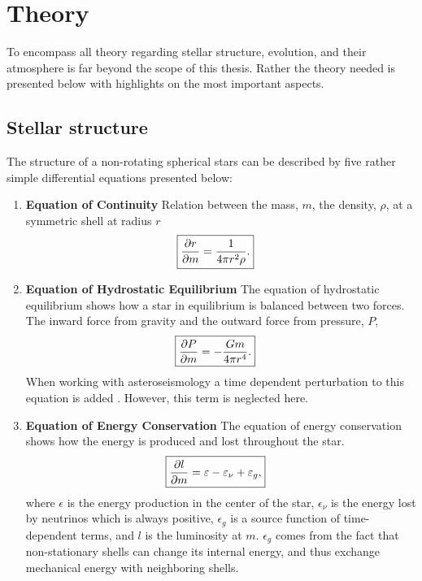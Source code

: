 \chapter{Theory}

To encompass all theory regarding stellar structure, evolution, and their
atmosphere is far beyond the scope of this thesis. Rather the theory needed is
presented below with highlights on the most important aspects.

\section{Stellar structure}

The structure of a non-rotating spherical stars can be described by five rather
simple differential equations \citep[see e.g.][]{kippenhahn} presented below:
\begin{enumerate}
    \item \textbf{Equation of Continuity}
        \nicebreak
        Relation between the mass, $m$, the density, $\rho$, at a symmetric
        shell at radius $r$
        \begin{align}
            \Aboxed{\pd{r}{m} &= \frac{1}{4\pi r^2\rho}.}
        \end{align}

    \item \textbf{Equation of Hydrostatic Equilibrium}
        \nicebreak
        The equation of hydrostatic equilibrium shows how a star in equilibrium
        is balanced between two forces. The inward force from gravity and the
        outward force from pressure, $P$,
        \begin{align}
            \Aboxed{\pd{P}{m} &= -\frac{Gm}{4\pi r^4}.}
        \end{align}
        When working with asteroseismology a time dependent perturbation to this
        equation is added \citep[see e.g.][for a thorough discussion]{Aerts2010}.
        However, this term is neglected here.


    \item \textbf{Equation of Energy Conservation}
        \nicebreak
        The equation of energy conservation shows how the energy is produced and
        lost throughout the star.
        \begin{align}
            \Aboxed{\pd{l}{m} = \epsilon - \epsilon_\nu + \epsilon_g,}
        \end{align}
        where $\epsilon$ is the energy production in the center of the star,
        $\epsilon_\nu$ is the energy lost by neutrinos which is always
        positive, $\epsilon_g$ is a source function of time-dependent terms,
        and $l$ is the luminosity at $m$. $\epsilon_g$ comes from the fact that
        non-stationary shells can change its internal energy, and thus exchange
        mechanical energy with neighboring shells.


\end{enumerate}

